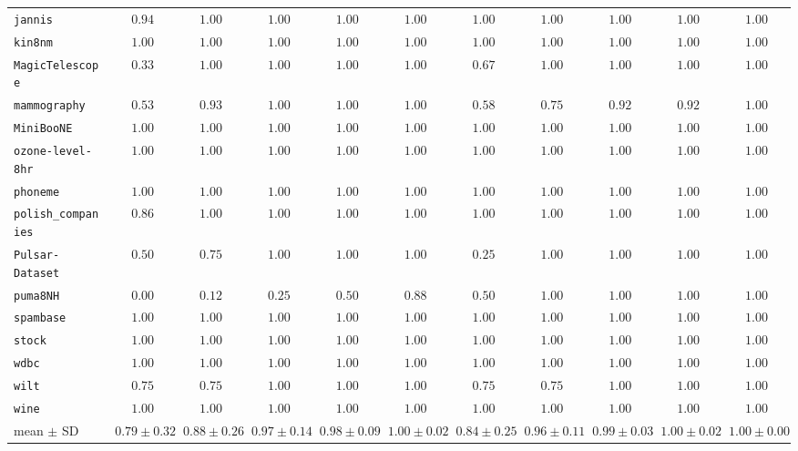 {\begin{tabular}{@{}lcccccccccc@{}}
\texttt{jannis} & $0.94$ & $1.00$ & $1.00$ & $1.00$ & $1.00$ & $1.00$ & $1.00$ & $1.00$ & $1.00$ & $1.00$ \\
\texttt{kin8nm} & $1.00$ & $1.00$ & $1.00$ & $1.00$ & $1.00$ & $1.00$ & $1.00$ & $1.00$ & $1.00$ & $1.00$ \\
\texttt{MagicTelescope} & $0.33$ & $1.00$ & $1.00$ & $1.00$ & $1.00$ & $0.67$ & $1.00$ & $1.00$ & $1.00$ & $1.00$ \\
\texttt{mammography} & $0.53$ & $0.93$ & $1.00$ & $1.00$ & $1.00$ & $0.58$ & $0.75$ & $0.92$ & $0.92$ & $1.00$ \\
\texttt{MiniBooNE} & $1.00$ & $1.00$ & $1.00$ & $1.00$ & $1.00$ & $1.00$ & $1.00$ & $1.00$ & $1.00$ & $1.00$ \\
\texttt{ozone-level-8hr} & $1.00$ & $1.00$ & $1.00$ & $1.00$ & $1.00$ & $1.00$ & $1.00$ & $1.00$ & $1.00$ & $1.00$ \\
\texttt{phoneme} & $1.00$ & $1.00$ & $1.00$ & $1.00$ & $1.00$ & $1.00$ & $1.00$ & $1.00$ & $1.00$ & $1.00$ \\
\texttt{polish\_companies} & $0.86$ & $1.00$ & $1.00$ & $1.00$ & $1.00$ & $1.00$ & $1.00$ & $1.00$ & $1.00$ & $1.00$ \\
\texttt{Pulsar-Dataset} & $0.50$ & $0.75$ & $1.00$ & $1.00$ & $1.00$ & $0.25$ & $1.00$ & $1.00$ & $1.00$ & $1.00$ \\
\texttt{puma8NH} & $0.00$ & $0.12$ & $0.25$ & $0.50$ & $0.88$ & $0.50$ & $1.00$ & $1.00$ & $1.00$ & $1.00$ \\
\texttt{spambase} & $1.00$ & $1.00$ & $1.00$ & $1.00$ & $1.00$ & $1.00$ & $1.00$ & $1.00$ & $1.00$ & $1.00$ \\
\texttt{stock} & $1.00$ & $1.00$ & $1.00$ & $1.00$ & $1.00$ & $1.00$ & $1.00$ & $1.00$ & $1.00$ & $1.00$ \\
\texttt{wdbc} & $1.00$ & $1.00$ & $1.00$ & $1.00$ & $1.00$ & $1.00$ & $1.00$ & $1.00$ & $1.00$ & $1.00$ \\
\texttt{wilt} & $0.75$ & $0.75$ & $1.00$ & $1.00$ & $1.00$ & $0.75$ & $0.75$ & $1.00$ & $1.00$ & $1.00$ \\
\texttt{wine} & $1.00$ & $1.00$ & $1.00$ & $1.00$ & $1.00$ & $1.00$ & $1.00$ & $1.00$ & $1.00$ & $1.00$ \\
\midrule mean $\pm$ SD & $0.79 \pm 0.32$ & $0.88 \pm 0.26$ & $0.97 \pm 0.14$ & $0.98 \pm 0.09$ & $1.00 \pm 0.02$ & $0.84 \pm 0.25$ & $0.96 \pm 0.11$ & $0.99 \pm 0.03$ & $1.00 \pm 0.02$ & $1.00 \pm 0.00$ \\
\bottomrule\end{tabular}}
